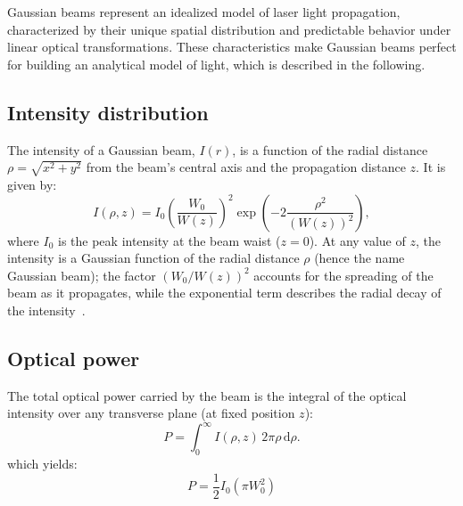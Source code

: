 \documentclass[prl,twocolumn]{revtex4-1}
\begin{document}
Gaussian beams represent an idealized model of laser light propagation, characterized by their unique spatial distribution and predictable behavior under linear optical transformations. These characteristics make Gaussian beams perfect for building an analytical model of light, which is described in the following.

\subsection{Intensity distribution}

The intensity of a Gaussian beam, $I(r)$, is a function of the radial distance $\rho = \sqrt{x^2 + y^2}$ from the beam's central axis and the propagation distance $z$. It is given by:
\begin{equation}
I(\rho, z) = I_0 \left( \frac{W_0}{W(z)} \right)^2 \exp\left(-2 \frac{\rho^2}{(W(z))^2}\right),
\end{equation}
where $I_0$ is the peak intensity at the beam waist ($z = 0$). At any value of $z$, the intensity is a Gaussian function of the radial distance $\rho$ (hence the name Gaussian beam); the factor $\left(W_0 / W(z)\right)^2$ accounts for the spreading of the beam as it propagates, while the exponential term describes the radial decay of the intensity~\cite{pap1}.

\subsection{Optical power}

The total optical power carried by the beam is the integral of the optical intensity over any transverse plane (at fixed position $z$):
\begin{equation}
P = \int_{0}^{\infty} I(\rho, z) \, 2\pi \rho \, \mathrm{d}\rho.
\end{equation}
which yields:
\begin{equation}
    P = \frac{1}{2} I_0 (\pi W_0^2)
\end{equation}
\end{document}
